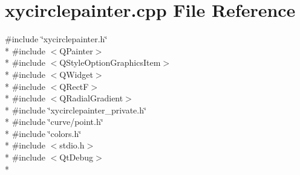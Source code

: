 \section{xycirclepainter.\+cpp File Reference}
\label{circles_2xycirclepainter_8cpp}
{\ttfamily \#include \char`\"{}xycirclepainter.\+h\char`\"{}}\\*
{\ttfamily \#include $<$Q\+Painter$>$}\\*
{\ttfamily \#include $<$Q\+Style\+Option\+Graphics\+Item$>$}\\*
{\ttfamily \#include $<$Q\+Widget$>$}\\*
{\ttfamily \#include $<$Q\+RectF$>$}\\*
{\ttfamily \#include $<$Q\+Radial\+Gradient$>$}\\*
{\ttfamily \#include \char`\"{}xycirclepainter\+\_\+private.\+h\char`\"{}}\\*
{\ttfamily \#include \char`\"{}curve/point.\+h\char`\"{}}\\*
{\ttfamily \#include \char`\"{}colors.\+h\char`\"{}}\\*
{\ttfamily \#include $<$stdio.\+h$>$}\\*
{\ttfamily \#include $<$Qt\+Debug$>$}\\*
